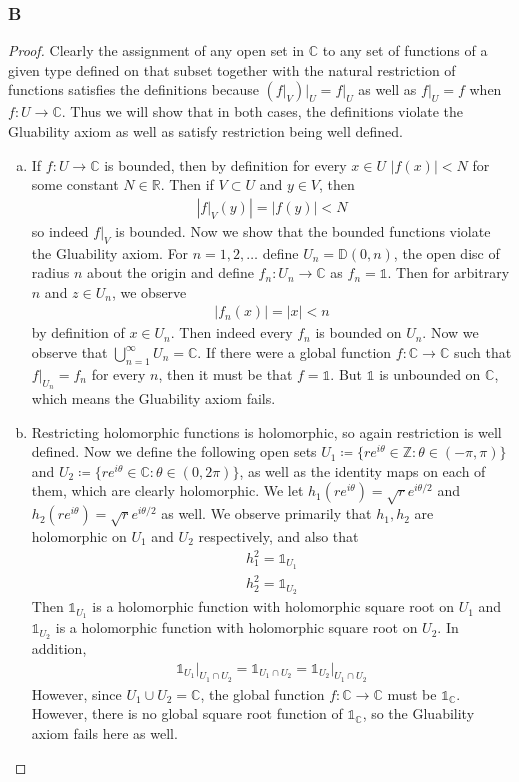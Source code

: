 \documentclass{article}
\newcommand{\R}{\mathbb{R}}
\newcommand{\Z}{\mathbb{Z}}
\newcommand{\C}{\mathbb{C}}
\newcommand{\D}{\mathbb{D}}
\newcommand{\altid}{\mathds{1}}
\begin{document}
\subsubsection{B}\label{2.2.B}
\begin{proof}
Clearly the assignment of any open set in $\C$ to any set of functions of a given type defined on that subset together with the natural restriction of functions satisfies the definitions because $(f\vert_V)\vert_U=f\vert_U$ as well as $f\vert_U=f$ when $f:U\to \C$. Thus we will show that in both cases, the definitions violate the Gluability axiom as well as satisfy restriction being well defined.
    \begin{enumerate}[(a)]
        \item If $f:U\to \C$ is bounded, then by definition for every $x\in U$ $|f(x)|<N$ for some constant $N\in \R$. Then if $V\subset U$ and $y\in V$, then
        \begin{align*}
            |f\vert_V(y)|=|f(y)|<N
        \end{align*}
        so indeed $f\vert_V$ is bounded. Now we show that the bounded functions violate the Gluability axiom. For $n=1,2,\dots$ define $U_n=\D(0,n)$, the open disc of radius $n$ about the origin and define $f_n:U_n\to \C$ as $f_n=\altid$. Then for arbitrary $n$ and $z\in U_n$, we observe
        \begin{align*}
            |f_n(x)|=|x|<n
        \end{align*}
        by definition of $x\in U_n$. Then indeed every $f_n$ is bounded on $U_n$. Now we observe that $\bigcup_{n=1}^\infty U_n=\C$. If there were a global function $f:\C\to \C$ such that $f\vert_{U_n}=f_n$ for every $n$, then it must be that $f=\altid$. But $\altid$ is unbounded on $\C$, which means the Gluability axiom fails.
        \item Restricting holomorphic functions is holomorphic, so again restriction is well defined. Now we define the following open sets $U_1\coloneqq \{re^{i\theta}\in \Z:\theta \in (-\pi,\pi)\}$ and $U_2\coloneqq \{re^{i\theta}\in \C:\theta \in (0,2\pi)\}$, as well as the identity maps on each of them, which are clearly holomorphic. We let $h_1(re^{i\theta})=\sqrt{r}e^{i\theta/2}$ and $h_2(re^{i\theta})=\sqrt{r}e^{i\theta/2}$ as well. We observe primarily that $h_1,h_2$ are holomorphic on $U_1$ and $U_2$ respectively, and also that
        \begin{align*}
            h_1^2=\altid_{U_1}\\
            h_2^2=\altid_{U_2}
        \end{align*}
        Then $\altid_{U_1}$ is a holomorphic function with holomorphic square root on $U_1$ and $\altid_{U_2}$ is a holomorphic function with holomorphic square root on $U_2$. In addition, 
        \begin{align*}
            \altid_{U_1}\vert_{U_1\cap U_2}=\altid_{U_1\cap U_2}=\altid_{U_2}\vert_{U_1\cap U_2}
        \end{align*} However, since $U_1\cup U_2=\C$, the global function $f:\C\to \C$ must be $\altid_{\C}$. However, there is no global square root function of $\altid_{\C}$, so the Gluability axiom fails here as well.
    \end{enumerate}
\end{proof}
\end{document}
